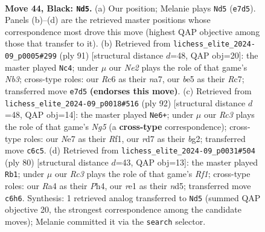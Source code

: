 \documentclass[11pt]{article}
\begin{document}
\clearpage

\begin{figure}[p]\centering
\begin{subfigure}{0.46\textwidth}\centering
\resizebox{\linewidth}{!}{%
\newchessgame
\chessboard[
  setfen={5k2/3Rn3/2r5/1p2B1p1/r7/4P1P1/b4P1P/4R1K1 b - - 7 44},
  showmover=false,
  pgfstyle=straightmove, color=movearrow, markmove={e7-d5}
]}
\caption{}
\end{subfigure}\hfill
\begin{subfigure}{0.46\textwidth}\centering
\resizebox{\linewidth}{!}{%
\newchessgame
\chessboard[
  setfen={7k/N1r5/Rn5p/1P4p1/8/6P1/1R3PKP/4r3 b - - 2 46},
  showmover=false,
  pgfstyle=straightmove, color=movearrow, markmove={b6-c4}
]}
\caption{}
\end{subfigure}
\\[4pt]
\begin{subfigure}{0.46\textwidth}\centering
\resizebox{\linewidth}{!}{%
\newchessgame
\chessboard[
  setfen={4R3/p5k1/1p4p1/2p3N1/2Pb1P1K/1r6/6b1/5R2 w - - 17 47},
  showmover=false,
  pgfstyle=straightmove, color=movearrow, markmove={g5-e6}
]}
\caption{}
\end{subfigure}\hfill
\begin{subfigure}{0.46\textwidth}\centering
\resizebox{\linewidth}{!}{%
\newchessgame
\chessboard[
  setfen={8/1p4pk/p3p2p/3np3/6PP/4r1N1/6K1/5R2 w - - 4 41},
  showmover=false,
  pgfstyle=straightmove, color=movearrow, markmove={f1-b1}
]}
\caption{}
\end{subfigure}
\caption{\textbf{Move 44, Black: \texttt{Nd5}.} (a) Our position; Melanie plays \texttt{Nd5} (\texttt{e7d5}). Panels (b)--(d) are the retrieved master positions whose correspondence most drove this move (highest QAP objective among those that transfer to it). (b) Retrieved from \texttt{lichess\_elite\_2024-09\_p0005\#299} (ply 91) [structural distance $d$=48, QAP obj=20]: the master played \texttt{Nc4}; under $\mu$ our \emph{Ne2} plays the role of that game's \emph{Nb3}; cross-type roles: our \emph{R}c6 as their \emph{n}a7, our \emph{b}e5 as their \emph{R}c7; transferred move \texttt{e7d5} \textbf{(endorses this move)}. (c) Retrieved from \texttt{lichess\_elite\_2024-09\_p0018\#516} (ply 92) [structural distance $d$=48, QAP obj=14]: the master played \texttt{Ne6+}; under $\mu$ our \emph{Rc3} plays the role of that game's \emph{Ng5} (a \textbf{cross-type} correspondence); cross-type roles: our \emph{N}e7 as their \emph{R}f1, our \emph{r}d7 as their \emph{b}g2; transferred move \texttt{c6c5}. (d) Retrieved from \texttt{lichess\_elite\_2024-09\_p0031\#504} (ply 80) [structural distance $d$=43, QAP obj=13]: the master played \texttt{Rb1}; under $\mu$ our \emph{Rc3} plays the role of that game's \emph{Rf1}; cross-type roles: our \emph{R}a4 as their \emph{P}h4, our \emph{r}e1 as their \emph{n}d5; transferred move \texttt{c6h6}. Synthesis: 1 retrieved analog transferred to \texttt{Nd5} (summed QAP objective 20, the strongest correspondence among the candidate moves); Melanie committed it via the \texttt{search} selector.}
\label{fig:thought-m87}
\end{figure}
\end{document}
